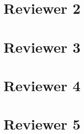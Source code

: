 \documentclass{article}
\begin{document}
  \section*{Reviewer 2}
  

  \section*{Reviewer 3}
  

  \section*{Reviewer 4}
  

  \section*{Reviewer 5}
  
\end{document}
